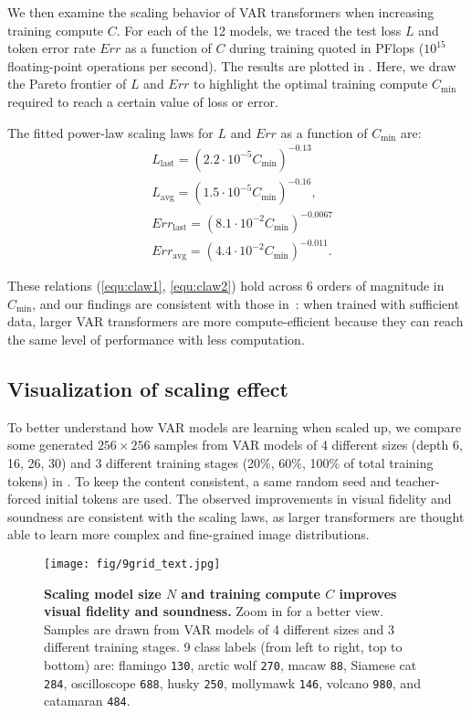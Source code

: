 We then examine the scaling behavior of VAR transformers when increasing training compute $C$.
For each of the 12 models, we traced the test loss $L$ and token error rate $Err$ as a function of $C$ during training quoted in PFlops ($10^{15}$ floating-point operations per second).
The results are plotted in .
Here, we draw the Pareto frontier of $L$ and $Err$ to highlight the optimal training compute $C_\text{min}$ required to reach a certain value of loss or error.

The fitted power-law scaling laws for $L$ and $Err$ as a function of $C_\text{min}$ are:
\begin{align}
    &L_\text{last} = (2.2 \cdot 10^{-5} C_\text{min})^{-0.13} \\
    &L_\text{avg} = (1.5 \cdot 10^{-5} C_\text{min})^{-0.16}, \label{equ:claw1} \\
    &Err_\text{last} = (8.1 \cdot 10^{-2} C_\text{min})^{-0.0067} \\
    &Err_\text{avg} = (4.4 \cdot 10^{-2} C_\text{min})^{-0.011}. \label{equ:claw2}
\end{align}

These relations (\ref{equ:claw1}, \ref{equ:claw2}) hold across 6 orders of magnitude in $C_\text{min}$, and our findings are consistent with those in~\cite{scalinglaw,scalingar}: when trained with sufficient data, larger VAR transformers are more compute-efficient because they can reach the same level of performance with less computation.

\subsection{Visualization of scaling effect} \label{sec:viss}
To better understand how VAR models are learning when scaled up, we compare some generated $256\times256$ samples from VAR models of 4 different sizes (depth 6, 16, 26, 30) and 3 different training stages (20\%, 60\%, 100\% of total training tokens) in .
To keep the content consistent, a same random seed and teacher-forced initial tokens are used.
The observed improvements in visual fidelity and soundness are consistent with the scaling laws, as larger transformers are thought able to learn more complex and fine-grained image distributions.

\begin{figure}[!th]
\begin{center}
\texttt{[image: fig/9grid\_text.jpg]}
\end{center}
\vspace{-6pt}
\caption{\small
\textbf{Scaling model size $N$ and training compute $C$ improves visual fidelity and soundness.}
Zoom in for a better view.
Samples are drawn from VAR models of 4 different sizes and 3 different training stages.
9 class labels (from left to right, top to bottom) are: flamingo \texttt{130}, arctic wolf \texttt{270}, macaw \texttt{88}, Siamese cat \texttt{284}, oscilloscope \texttt{688}, husky \texttt{250}, mollymawk \texttt{146}, volcano \texttt{980}, and catamaran \texttt{484}.
}
\label{fig:9grid}
\end{figure}

